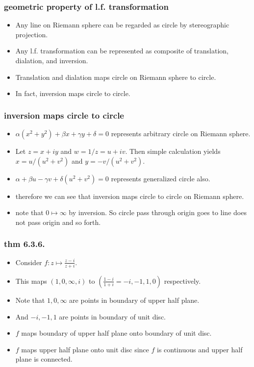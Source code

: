 \documentclass{beamer}
\begin{document}
\begin{frame}
\frametitle{geometric property of l.f. transformation}
\begin{itemize}
\item Any line on Riemann sphere can be regarded as circle by stereographic projection. \\

\item	Any l.f. transformation can be represented as composite of translation, dialation, and inversion. \\

\item	Translation and dialation maps circle on Riemann sphere to circle. \\

\item	In fact, inversion maps circle to circle. 
	\end{itemize}
\end{frame}
	\begin{frame}
		\frametitle{inversion maps circle to circle}
		\begin{itemize}
\item	$\alpha(x^2 + y^2) + \beta x + \gamma y + \delta = 0$ represents arbitrary circle on Riemann sphere.\\

\item Let $z = x+iy$ and $w = 1/z = u+iv$. Then simple calculation yields $x = u/(u^2 + v^2)$ and $y = -v/(u^2+v^2)$.

\item $\alpha + \beta u - \gamma v + \delta(u^2 + v^2) = 0$ represents generalized circle also. 

\item therefore we can see that inversion maps circle to circle on Riemann sphere.

\item note that $0 \mapsto \infty$ by inversion. So circle pass through origin goes to line does not pass origin and so forth.
\end{itemize}
\end{frame}

\begin{frame}
	\frametitle{thm 6.3.6.}
	\begin{itemize}
		\item Consider $f:z \mapsto \frac{z-i}{z+i}$.
		\item This maps $(1, 0, \infty, i)$ to $(\frac{1-i}{1+i}=-i, -1, 1, 0)$ respectively.
		\item Note that $1, 0, \infty$ are points in boundary of upper half plane.
		\item And $-i, -1, 1$ are points in boundary of unit disc.
		\item $f$ maps boundary of upper half plane onto boundary of unit disc.
		\item $f$ maps upper half plane onto unit disc since $f$ is continuous and upper half plane is connected.
	\end{itemize}
\end{frame}
\end{document}
